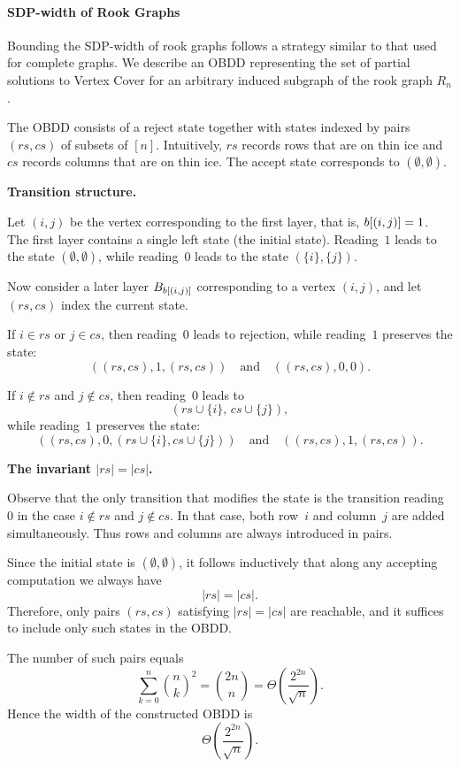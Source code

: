 \paragraph*{SDP-width of Rook Graphs}

Bounding the SDP-width of rook graphs follows a strategy similar to that used
for complete graphs. We describe an OBDD representing the set of partial
solutions to {\sc Vertex Cover} for an arbitrary induced subgraph of the rook
graph $R_n$.

The OBDD consists of a reject state together with states indexed by pairs
$(rs,cs)$ of subsets of $[n]$. Intuitively, $rs$ records rows that are on thin
ice and $cs$ records columns that are on thin ice. The accept state corresponds
to $(\emptyset,\emptyset)$.

\medskip
\noindent\textbf{Transition structure.}

Let $(i,j)$ be the vertex corresponding to the first layer, that is,
$b[(i,j)] = 1$. The first layer contains a single left state
(the initial state). Reading~$1$ leads to the state $(\emptyset,\emptyset)$,
while reading~$0$ leads to the state $(\{i\},\{j\})$.

Now consider a later layer $B_{b[(i,j)]}$ corresponding to a
vertex $(i,j)$, and let $(rs,cs)$ index the current state.

If $i \in rs$ or $j \in cs$, then reading~$0$ leads to rejection, while
reading~$1$ preserves the state:
\[
((rs,cs),1,(rs,cs))
\quad\text{and}\quad
((rs,cs),0,0).
\]

If $i \notin rs$ and $j \notin cs$, then reading~$0$ leads to
\[
(rs \cup \{i\},\, cs \cup \{j\}),
\]
while reading~$1$ preserves the state:
\[
((rs,cs),0,(rs \cup \{i\}, cs \cup \{j\}))
\quad\text{and}\quad
((rs,cs),1,(rs,cs)).
\]

\medskip
\noindent\textbf{The invariant $|rs| = |cs|$.}

Observe that the only transition that modifies the state is the transition
reading~$0$ in the case $i \notin rs$ and $j \notin cs$. In that case,
both row~$i$ and column~$j$ are added simultaneously.
Thus rows and columns are always introduced in pairs.

Since the initial state is $(\emptyset,\emptyset)$, it follows inductively that
along any accepting computation we always have
\[
|rs| = |cs|.
\]
Therefore, only pairs $(rs,cs)$ satisfying $|rs|=|cs|$ are reachable, and it
suffices to include only such states in the OBDD.

The number of such pairs equals
\[
\sum_{k=0}^{n} \binom{n}{k}^2
= \binom{2n}{n}
= \Theta\!\left(\frac{2^{2n}}{\sqrt{n}}\right).
\]
Hence the width of the constructed OBDD is
\[
\Theta\!\left(\frac{2^{2n}}{\sqrt{n}}\right).
\]



